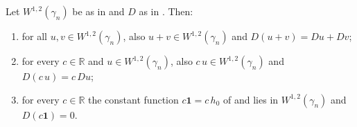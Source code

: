 \begin{lemma}
Let $W^{1,2}(\gamma_n)$ be as in  and $D$ as in
.  Then:
\begin{enumerate}
\item for all $u, v \in W^{1,2}(\gamma_n)$, also $u + v \in W^{1,2}(\gamma_n)$ and
$D(u+v) = Du + Dv$;
\item for every $c \in \mathbb{R}$ and $u \in W^{1,2}(\gamma_n)$, also
$c\,u \in W^{1,2}(\gamma_n)$ and $D(c\,u) = c\,Du$;
\item for every $c \in \mathbb{R}$ the constant function $c\mathbf{1} = c\,h_0$ of
 and  lies in $W^{1,2}(\gamma_n)$ and
$D(c\mathbf{1}) = 0$.
\end{enumerate}
\end{lemma}
